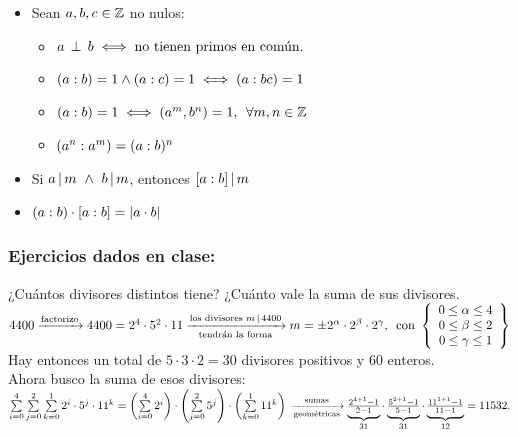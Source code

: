 \begin{itemize}
\begin{itemize}
		      \item Sean $a,b,c \in \mathbb Z$ no nulos:
		            \begin{itemize}
			            \item $a \, \perp \, b \iff \text{no tienen primos en común}.$
			            \item $(a:b) = 1 \land (a : c) = 1 \iff (a : bc) = 1$
			            \item $(a:b) = 1 \iff (a^m, b^n) = 1 ,\, \;\forall m, n \in\mathbb Z$
			            \item $(a^n:a^m) = (a:b)^n$
		            \end{itemize}

		      \item Si $a \, | \, m \ \land \  b \, | \, m$, entonces $[a:b] \, | \, m$

		      \item $(a:b) \cdot [a:b] = |a \cdot b|$
	      \end{itemize}

\end{itemize}
\subsubsection*{Ejercicios dados en clase:}
 ¿Cuántos divisores distintos tiene? ¿Cuánto vale la suma de sus divisores.\\
\separadorCorto
$
	4400
	\flecha{factorizo} 4400 = 2^4 \cdot 5^2 \cdot 11
	\flecha{los divisores $m \divideA 4400$}[tendrán la forma]
	m = \pm 2^{\alpha} \cdot 2^{\beta} \cdot 2^{\gamma},\,
	\text{ con }
	\llaves{c}{
		0 \leq \alpha\leq 4\\
		0 \leq \beta \leq 2\\
		0 \leq \gamma \leq 1
	}
$\\
Hay entonces un total de $5 \cdot 3 \cdot 2 = 30$ divisores positivos y $60$ enteros.\\
Ahora busco la suma de esos divisores:
$
	\sumatoria{i=0}{4} \sumatoria{j=0}{2}\sumatoria{k=0}{1} 2^i \cdot 5^j \cdot 11^k =
	\parentesis{\sumatoria{i=0}{4} 2^i } \cdot \parentesis{ \sumatoria{j=0}{2} 5^j } \cdot \parentesis{ \sumatoria{k=0}{1} 11^k}\\
	\flecha{sumas}[geométricas]
	\ub{\frac{2^{4+1} - 1}{2 - 1}}{31} \cdot \ub{\frac{5^{2+1} - 1}{5 - 1}}{31} \cdot \ub{\frac{11^{1+1} - 1}{11 - 1}}{12} = 11532.
$\\

